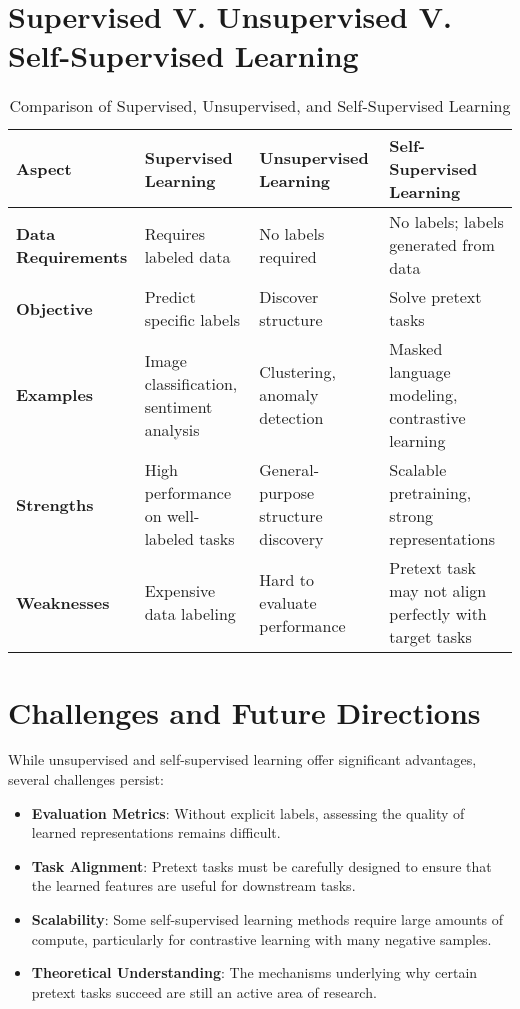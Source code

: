 \documentclass[openany]{book}
\begin{document}
\section{Supervised V. Unsupervised V. Self-Supervised Learning}
\begin{table}[h!]
\centering
\begin{tabular}{p{1in}p{1in}p{2in}p{2in}}
\hline
\textbf{Aspect} & \textbf{Supervised Learning} & 
\textbf{Unsupervised Learning} & \textbf{Self-Supervised Learning} \\
\hline
\textbf{Data Requirements} & Requires labeled data & No labels required & 
No labels; labels generated from data \\
\hline
\textbf{Objective} & Predict specific labels & Discover structure & 
Solve pretext tasks \\
\hline
\textbf{Examples} & Image classification, sentiment analysis & 
Clustering, anomaly detection & Masked language modeling, contrastive 
learning \\
\hline
\textbf{Strengths} & High performance on well-labeled tasks & 
General-purpose structure discovery & Scalable pretraining, strong 
representations \\
\hline
\textbf{Weaknesses} & Expensive data labeling & Hard to evaluate 
performance & Pretext task may not align perfectly with target tasks \\
\hline
\end{tabular}
\caption{Comparison of Supervised, Unsupervised, and Self-Supervised Learning}
\end{table}

\section{Challenges and Future Directions}
While unsupervised and self-supervised learning offer significant advantages, 
several challenges persist:
\begin{itemize}
    \item \textbf{Evaluation Metrics}: Without explicit labels, assessing the 
    quality of learned representations remains difficult.
    \item \textbf{Task Alignment}: Pretext tasks must be carefully designed to 
    ensure that the learned features are useful for downstream tasks.
    \item \textbf{Scalability}: Some self-supervised learning methods require 
    large amounts of compute, particularly for contrastive learning with many 
    negative samples.
    \item \textbf{Theoretical Understanding}: The mechanisms underlying why 
    certain pretext tasks succeed are still an active area of research.
\end{itemize}
\end{document}
